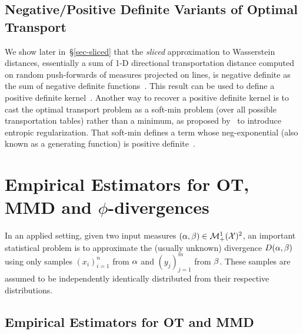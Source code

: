 \subsection{Negative/Positive Definite Variants of Optimal Transport}

We show later in~\S\ref{sec-sliced} that the \emph{sliced} approximation to Wasserstein distances, essentially a sum of 1-D directional transportation distance computed on random push-forwards of measures projected on lines, is negative definite as the sum of negative definite functions~\citep[\S 3.1.11]{berg84harmonic}. This result can be used to define a positive definite kernel~\citep{kolouri2016sliced}. Another way to recover a positive definite kernel is to cast the optimal transport problem as a soft-min problem (over all possible transportation tables) rather than a minimum, as proposed by~\citet{kosowsky1994invisible} to introduce entropic regularization. That soft-min defines a term whose neg-exponential (also known as a generating function) is positive definite~\citep{cuturi2012positivity}.





\section{Empirical Estimators for OT, MMD and $\phi$-divergences}
\label{sec-empirical-wass}

In an applied setting, given two input measures $(\alpha,\beta) \in \mathcal{M}_+^1(\mathcal{X})^2$, an important statistical problem is to approximate the (usually unknown) divergence $D(\alpha,\beta)$ using only samples $(x_i)_{i=1}^n$ from $\alpha$ and $(y_j)_{j=1}^m$ from $\beta$. These samples are assumed to be independently identically distributed from their respective distributions. 

\subsection{Empirical Estimators for OT and MMD}

